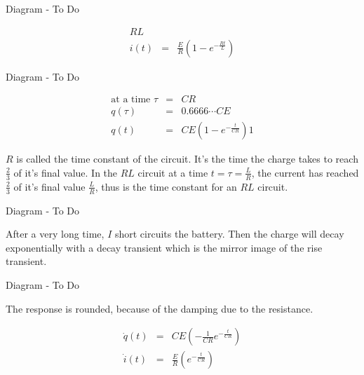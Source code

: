 \documentclass[a4paper,12pt]{article}
\begin{document}
\begin{table}[hbtp]

Diagram - To Do

\end{table}

\begin{eqnarray*}
RL & & \\
i(t) & = & \frac{E}{R} \left(1 - e^{- \frac{Rt}{L}} \right)
\end{eqnarray*}

\begin{table}[hbtp]

Diagram - To Do

\end{table}

\begin{eqnarray*}
\mbox{at a time } \tau & = & CR \\
q(\tau) & = & 0.6666 \cdots CE \\
q(t) & = & CE \left( 1 - e^{- \frac{t}{CR}} \right) 1
\end{eqnarray*}

$R$ is called the time constant of the circuit. It's the time the charge
takes to reach $\frac{2}{3}$ of it's final value. In the $RL$ circuit 
at a time $t = \tau = \frac{L}{R}$, the current has reached
$\frac{2}{3}$ of it's final value $\frac{L}{R}$, thus is the time
constant for an $RL$ circuit.

\begin{table}[hbtp]

Diagram - To Do

\end{table}

After a very long time, $I$ short circuits the battery. Then the charge
will decay exponentially with a decay transient which is the mirror
image of the rise transient.

\begin{table}[hbtp]

Diagram - To Do

\end{table}

The response is rounded, because of the damping due to the resistance.

\begin{eqnarray*}
\dot{q}(t) & = & CE \left( - \frac{1}{CR} e^{- \frac{t}{CR}} \right) \\
\dot{i}(t) & = & \frac{E}{R} \left( e^{- \frac{t}{CR}} \right)
\end{eqnarray*}
\end{document}
